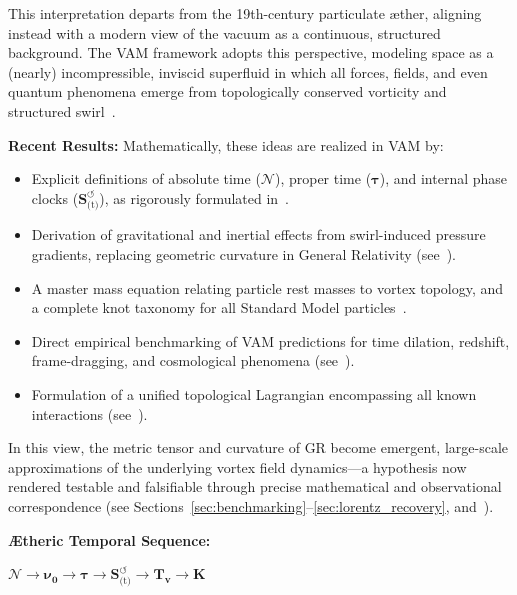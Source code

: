 \documentclass[preprint,notitlepage]{revtex4-2}
\begin{document}
This interpretation departs from the 19th-century particulate æther, aligning instead with a modern view of the vacuum as a continuous, structured background. The VAM framework adopts this perspective, modeling space as a (nearly) incompressible, inviscid superfluid in which all forces, fields, and even quantum phenomena emerge from topologically conserved vorticity and structured swirl~\cite{VAM-8, VAM-1, VAM-2}.

\vspace{0.7em}
\noindent\textbf{Recent Results:}
Mathematically, these ideas are realized in VAM by:
\begin{itemize}
    \item Explicit definitions of absolute time (\(\boldsymbol{\mathcal{N}}\)), proper time (\(\boldsymbol{\tau}\)), and internal phase clocks (\(\boldsymbol{S}^{\boldsymbol{\circlearrowleft}}_\text{(t)}\)), as rigorously formulated in~\cite{VAM-8, VAM-1}.
    \item Derivation of gravitational and inertial effects from swirl-induced pressure gradients, replacing geometric curvature in General Relativity (see~\cite{VAM-2, VAM-3, VAM-8}).
    \item A master mass equation relating particle rest masses to vortex topology, and a complete knot taxonomy for all Standard Model particles~\cite{VAM-8, VAM-11}.
    \item Direct empirical benchmarking of VAM predictions for time dilation, redshift, frame-dragging, and cosmological phenomena (see~\cite{VAM-3, VAM-8}).
    \item Formulation of a unified topological Lagrangian encompassing all known interactions (see~\cite{VAM-14}).
\end{itemize}

In this view, the metric tensor and curvature of GR become emergent, large-scale approximations of the underlying vortex field dynamics—a hypothesis now rendered testable and falsifiable through precise mathematical and observational correspondence (see Sections~\ref{sec:benchmarking}–\ref{sec:lorentz_recovery}, and~\cite{VAM-8}).

\vspace{0.8em}
\noindent\textbf{Ætheric Temporal Sequence:}
\begin{center}
\(\boldsymbol{\mathcal{N}} \to \boldsymbol{\nu_0} \to \boldsymbol{\tau} \to \boldsymbol{S}^{\boldsymbol{\circlearrowleft}}_\text{(t)} \to \boldsymbol{T_v} \to \mathbb{\boldsymbol{K}}\)
\end{center}
\end{document}
